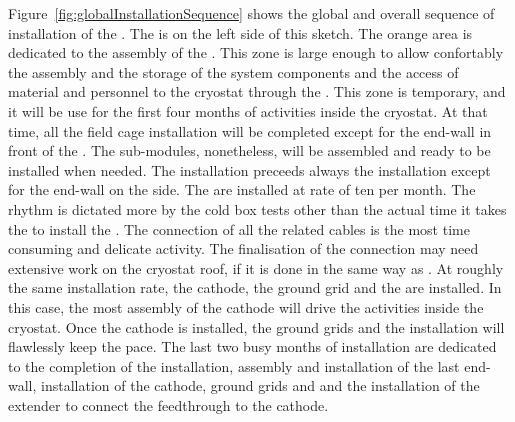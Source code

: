 Figure~\ref{fig:globalInstallationSequence} shows the global and overall sequence of installation of the  .
The  is on the left side of this sketch.
The orange area is dedicated to the assembly of the .
This zone is large enough to allow confortably the assembly and the storage of the  system components and the access of material and personnel to the cryostat through the .
This zone is temporary, and it will be use for the first four months of activities inside the cryostat.
At that time, all the field cage installation will be completed except for the end-wall in front of the .
The  sub-modules, nonetheless, will be assembled and ready to be installed when needed.
The  installation preceeds always the  installation except for the end-wall on the  side.
The  are installed at rate of ten  per month.
The rhythm is dictated more by the cold box tests other than the actual time it takes the to install the .
The connection of all the  related cables is the most time consuming and delicate activity.
The finalisation of the   connection may need extensive work on the cryostat roof, if it is done in the same way as .
At roughly the same installation rate, the cathode, the ground grid and the  are installed.
In this case, the most assembly of the cathode will drive the activities inside the cryostat.
Once the cathode is installed, the ground grids and the  installation will flawlessly keep the pace.
The last two busy months of  installation are dedicated to the completion of the  installation, assembly and installation of the last  end-wall, installation of the cathode, ground grids and  and the installation of the  extender to connect the  feedthrough to the cathode.


